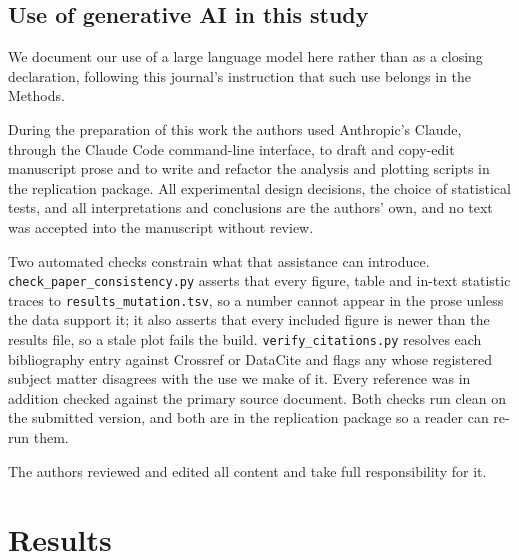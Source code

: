 \documentclass[smallextended]{svjour3}
\begin{document}
\subsection{Use of generative AI in this study}
\label{sec:methods-ai}

We document our use of a large language model here rather than as a
closing declaration, following this journal's instruction that such
use belongs in the Methods.

During the preparation of this work the authors used Anthropic's
Claude, through the Claude Code command-line interface, to draft and
copy-edit manuscript prose and to write and refactor the analysis and
plotting scripts in the replication package. All experimental design
decisions, the choice of statistical tests, and all interpretations
and conclusions are the authors' own, and no text was accepted into
the manuscript without review.

Two automated checks constrain what that assistance can introduce.
\texttt{check\_paper\_consistency.py} asserts that every figure,
table and in-text statistic traces to
\texttt{results\_mutation.tsv}, so a number cannot appear in the
prose unless the data support it; it also asserts that every included
figure is newer than the results file, so a stale plot fails the
build. \texttt{verify\_citations.py} resolves each bibliography entry
against Crossref or DataCite and flags any whose registered subject
matter disagrees with the use we make of it. Every reference was in
addition checked against the primary source document. Both checks run
clean on the submitted version, and both are in the replication
package so a reader can re-run them.

The authors reviewed and edited all content and take full
responsibility for it.

\section{Results}\label{sec:results}
\end{document}
